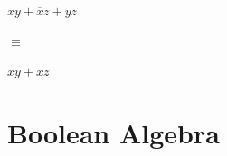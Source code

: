 \documentclass[12pt,openany]{book}
\begin{document}
\begin{center}
									\begin{minipage}{1.4\textwidth}
										\noindent %
										\hspace*{-10px}
										      	\begin{minipage}{0.30\textwidth} %
										      		\centering %
										      		\begin{venndiagram3sets}[labelA=\(x\), labelB=\(y\), labelC=\(z\)]
										      			\fillACapB
										      			\fillOnlyC
										      			\fillBCapC
										      		\end{venndiagram3sets}
										      		$ xy + \overline{x}z + yz $
										      	\end{minipage}%
												\hspace*{40px}
										      	{\large $\equiv$} %
												\hspace*{10px}
												\vspace*{-50px}
												\begin{minipage}{0.45\textwidth} %
										      		\centering %
										      		\begin{venndiagram3sets}[labelA=\(x\), labelB=\(y\), labelC=\(z\)]
										      			\fillACapB
										      			\fillOnlyC
										      			\fillBCapC
										      		\end{venndiagram3sets}\newline
										      		$ xy + \bar{x}z$
										      	\end{minipage}
									\end{minipage}
\end{center}
			
			      	
			      	\newpage
			      	
			      	
			      	\section{Boolean Algebra}
			      	      
\end{document}

